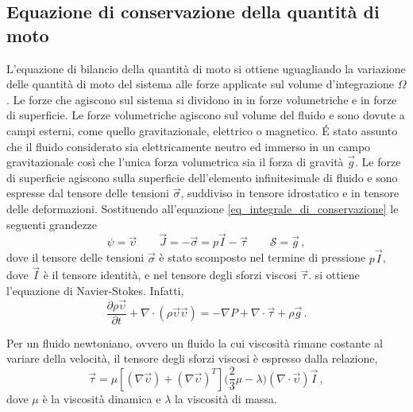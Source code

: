 \subsection{Equazione di conservazione della quantità di moto}
L'equazione di bilancio della quantità di moto si ottiene uguagliando la 
variazione delle quantità di moto del sistema alle forze applicate sul volume 
d'integrazione $\Omega$.
Le forze che agiscono sul sistema si dividono in in forze volumetriche e in 
forze di superficie.
Le forze volumetriche agiscono sul volume del fluido e sono dovute a campi 
esterni, come quello gravitazionale, elettrico o magnetico.
\'E stato assunto che il fluido considerato sia elettricamente neutro ed 
immerso 
in un campo gravitazionale così che l'unica forza volumetrica sia il forza di 
gravità $\vec{g}$.
Le forze di superficie agiscono sulla superficie dell'elemento infinitesimale 
di 
fluido e sono espresse dal tensore delle tensioni $\vec{\sigma}$, suddiviso in 
tensore idrostatico e in tensore delle deformazioni.
Sostituendo all'equazione \eqref{eq_integrale_di_conservazione} le seguenti 
grandezze
\begin{equation}
\psi= \vec{\upsilon} \qquad \vec{J}=-\vec{\sigma}= p \vec{I} - \vec{\tau} 
\qquad 
\mathcal{S}=\vec{g} \,,
\end{equation}
dove il tensore delle tensioni $\vec{\sigma}$ è stato scomposto nel termine di 
pressione $p\vec{I}$, dove $\vec{I}$ è il tensore identità, e nel tensore degli 
sforzi viscosi $\vec{\tau}$. si ottiene l'equazione di Navier-Stokes.
Infatti,
\begin{equation}
\label{eq_navier-stokes}
\frac{\partial \rho \vec{\upsilon}}{\partial t} + \nabla \cdot (\rho 
\vec{\upsilon}\vec{\upsilon})= -\nabla P + \nabla \cdot \vec{\tau} + \rho 
\vec{g} \,.
\end{equation}

Per un fluido newtoniano, ovvero un fluido la cui viscosità rimane costante al 
variare della velocità, il tensore degli sforzi viscosi è espresso dalla 
relazione,
\begin{equation}
\vec{\tau}=\mu [(\nabla\vec{\upsilon})+(\nabla\vec{\upsilon})^T]  
\biggl(\frac{2}{3}\mu-\lambda\biggr)(\nabla \cdot \vec{\upsilon})\vec{I} \,,
\end{equation}
dove $\mu$ è la viscosità dinamica e $\lambda$ la viscosità di massa.

